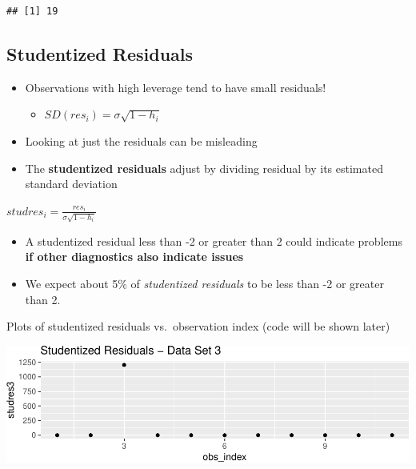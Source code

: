 \documentclass[]{extarticle}
\newenvironment{Shaded}{\begin{snugshade}}{\end{snugshade}}
\newcommand{\DecValTok}[1]{\textcolor[rgb]{0.00,0.00,0.81}{#1}}
\newcommand{\CommentTok}[1]{\textcolor[rgb]{0.56,0.35,0.01}{\textit{#1}}}
\newcommand{\OperatorTok}[1]{\textcolor[rgb]{0.81,0.36,0.00}{\textbf{#1}}}
\newcommand{\NormalTok}[1]{#1}
\providecommand{\tightlist}{%
  \setlength{\itemsep}{0pt}\setlength{\parskip}{0pt}}
\begin{document}
\begin{Shaded}
\end{Shaded}

\begin{verbatim}
## [1] 19
\end{verbatim}

\newpage

\subsection{Studentized Residuals}\label{studentized-residuals}

\begin{itemize}
\tightlist
\item
  Observations with high leverage tend to have small residuals!

  \begin{itemize}
  \tightlist
  \item
    \(SD(res_i) = \sigma \sqrt{1 - h_i}\)
  \end{itemize}
\item
  Looking at just the residuals can be misleading
\item
  The \textbf{studentized residuals} adjust by dividing residual by its
  estimated standard deviation
\end{itemize}

\(studres_i = \frac{res_i}{\hat{\sigma} \sqrt{1 - h_i}}\)

\begin{itemize}
\tightlist
\item
  A studentized residual less than -2 or greater than 2 could indicate
  problems \textbf{if other diagnostics also indicate issues}
\item
  We expect about 5\% of \emph{studentized residuals} to be less than -2
  or greater than 2.
\end{itemize}

Plots of studentized residuals vs.~observation index (code will be shown
later)

\includegraphics{20190417_residual_diagnostics_files/figure-latex/unnamed-chunk-6-1.pdf}
\end{document}
